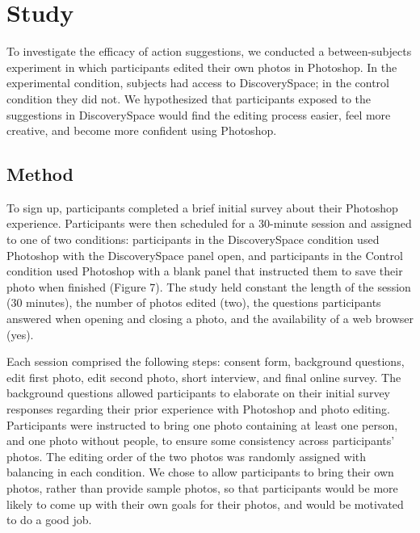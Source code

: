 \section{Study}
To investigate the efficacy of action suggestions, we conducted a between-subjects experiment in which participants edited their own photos in Photoshop. In the experimental condition, subjects had access to Discovery\-Space; in the control condition they did not. We hypothesized that participants exposed to the suggestions in Discovery\-Space would find the editing process easier, feel more creative, and become more confident using Photoshop. 

\subsection{Method}
To sign up, participants completed a brief initial survey about their Photoshop experience. Participants were then scheduled for a 30-minute session and assigned to one of two conditions: participants in the Discovery\-Space condition used Photoshop with the Discovery\-Space panel open, and participants in the Control condition used Photoshop with a blank panel that instructed them to save their photo when finished (Figure 7). The study held constant the length of the session (30 minutes), the number of photos edited (two), the questions participants answered when opening and closing a photo, and the availability of a web browser (yes). 

Each session comprised the following steps: consent form, background questions, edit first photo, edit second photo, short interview, and final online survey. The background questions allowed participants to elaborate on their initial survey responses regarding their prior experience with Photoshop and photo editing. Participants were instructed to bring one photo containing at least one person, and one photo without people, to ensure some consistency across participants' photos. The editing order of the two photos was randomly assigned with balancing in each condition. We chose to allow participants to bring their own photos, rather than provide sample photos, so that participants would be more likely to come up with their own goals for their photos, and would be motivated to do a good job. 

